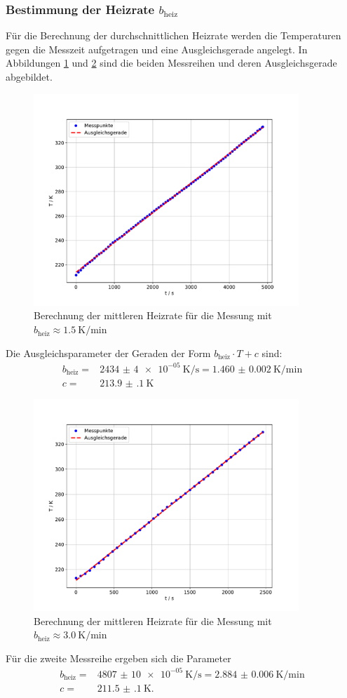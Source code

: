 \subsubsection{Bestimmung der Heizrate $b_\text{heiz}$}
Für die Berechnung der durchschnittlichen Heizrate werden die
Temperaturen gegen die Messzeit aufgetragen und eine Ausgleichsgerade angelegt.
In Abbildungen \ref{fig:heiz1} und \ref{fig:heiz2} sind die beiden Messreihen
und deren Ausgleichsgerade abgebildet.
\begin{figure}
  \centering
  \includegraphics[width=10.0cm]{Messdaten_1_rate.pdf}
  \caption{Berechnung der mittleren Heizrate für die Messung
  mit $b_\text{heiz} \approx \SI{1.5}{\kelvin\per\minute}$}
  \label{fig:heiz1}
\end{figure}
Die Ausgleichsparameter der Geraden der Form $b_\text{heiz} \cdot T + c$
sind:
\begin{align*}
  b_\text{heiz} =& \SI{2434(4)e-05}{\kelvin\per\second} = \SI{1.460(2)}{\kelvin\per\minute}\\
  c = & \SI{213.9(1)}{\kelvin}
\end{align*}
\begin{figure}
  \centering
  \includegraphics[width=10.0cm]{Messdaten_2_rate.pdf}
  \caption{Berechnung der mittleren Heizrate für die Messung
  mit $b_\text{heiz} \approx \SI{3.0}{\kelvin\per\minute}$}
  \label{fig:heiz2}
\end{figure}
Für die zweite Messreihe ergeben sich die Parameter
\begin{align*}
  b_\text{heiz} =& \SI{4807(10)e-05}{\kelvin\per\second} = \SI{2.884(6)}{\kelvin\per\minute}\\
  c = & \SI{211.5(1)}{\kelvin}.
\end{align*}
